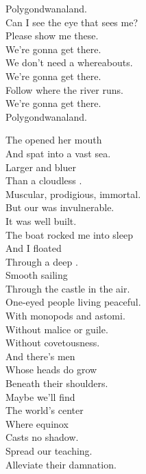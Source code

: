 Polygondwanaland. \\
Can I see the eye that sees me? \\
Please show me these. \\

We're gonna get there. \\
We don't need a whereabouts. \\
We're gonna get there. \\
Follow where the river runs. \\
We're gonna get there. \\
Polygondwanaland. \\




The  opened her mouth \\
And spat into a vast sea. \\
Larger and bluer \\
Than a cloudless . \\
Muscular, prodigious, immortal. \\
But our  was invulnerable. \\
It was well built. \\
The boat rocked me into sleep \\
And I floated \\
Through a deep . \\
Smooth sailing \\
Through the castle in the air. \\

One-eyed people living peaceful. \\
With monopods and astomi. \\
Without malice or guile. \\
Without covetousness. \\

And there's men \\
Whose heads do grow \\
Beneath their shoulders. \\
Maybe we'll find \\
The world's center \\
Where equinox \\
Casts no shadow. \\
Spread our teaching. \\
Alleviate their damnation. \\

